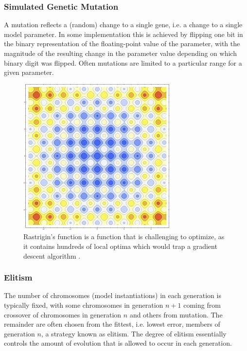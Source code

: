 \subsubsection{Simulated Genetic Mutation}
A mutation reflects a (random) change to a single gene, i.e. a change to a single model parameter.  In some implementation this is achieved by flipping one bit in the binary representation of the floating-point value of the parameter, with the magnitude of the resulting change in the parameter value depending on which binary digit was flipped.  Often mutations are limited to a particular range for a given parameter.
\begin{figure}
\begin{center}

\includegraphics[scale=0.5]{figures/rastagrind}
\caption{Rastrigin's function is a function that is challenging to optimize, as it contains hundreds of local optima which would trap a gradient descent algorithm \citep{rastrigin1974systems}.}
\label{fig:rastrigin}

\end{center}

\end{figure}

\subsubsection{Elitism}
The number of chromosomes (model instantiations) in each generation is typically fixed, with some chromosomes in generation $n+1$ coming from crossover of chromosomes in generation $n$ and others from mutation.
The remainder are often chosen from the fittest, i.e. lowest error, members of generation $n$, a strategy known as elitism.
The degree of elitism essentially controls the amount of evolution that is allowed to occur in each generation.

